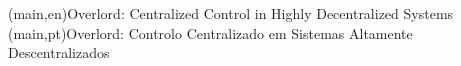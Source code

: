 
%


\nttitle(main,en){Overlord: Centralized Control in Highly Decentralized Systems}%
\nttitle(main,pt){Overlord: Controlo Centralizado em Sistemas Altamente Descentralizados}%




